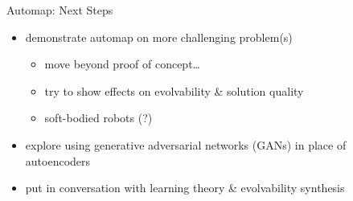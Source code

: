 \begin{frame}{Automap: Next Steps}

\begin{itemize}[<+->]
\item demonstrate automap on more challenging problem(s)
\begin{itemize}
\item move beyond proof of concept\dots
\item try to show effects on evolvability \& solution quality
\item soft-bodied robots (?)
\end{itemize}
\item explore using generative adversarial networks (GANs) in place of autoencoders
\item put in conversation with learning theory \& evolvability synthesis \cite{kouvaris2017evolution}
\end{itemize}

\end{frame}
